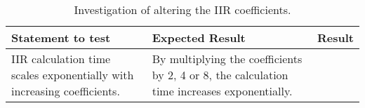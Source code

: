 \begin{table}
	\caption{Investigation of altering the IIR coefficients.}
	\label{tab:IIRtest}
	\begin{tabularx}{\textwidth}{X X X}
		Statement to test	& Expected Result	& Result \\
		\toprule
		IIR calculation time scales exponentially with increasing coefficients. & By multiplying the coefficients by 2, 4 or 8, the calculation time increases exponentially. & \\
	\end{tabularx}
\end{table}